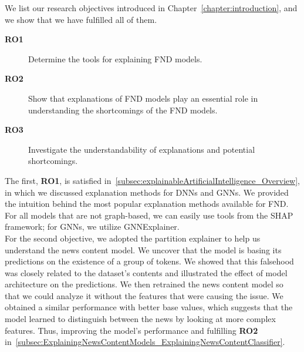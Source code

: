 We list our research objectives introduced in Chapter~\ref{chapter:introduction}, and we show that we have fulfilled all of them.
\begin{description}
    \item[\textbf{RO1}] Determine the tools for explaining FND models.
    \item[\textbf{RO2}] Show that explanations of FND models play an essential role in understanding the shortcomings of the FND models.
    \item[\textbf{RO3}] Investigate the understandability of explanations and potential shortcomings.
\end{description}
The first, \textbf{RO1}, is satisfied in~\ref{subsec:explainableArtificialIntelligence_Overview}, in which we discussed explanation methods for DNNs and GNNs. We provided the intuition behind the most popular explanation methods available for FND. For all models that are not graph-based, we can easily use tools from the SHAP framework; for GNNs, we utilize GNNExplainer. \\
For the second objective, we adopted the partition explainer to help us understand the news content model. We uncover that the model is basing its predictions on the existence of a group of tokens. We showed that this falsehood was closely related to the dataset's contents and illustrated the effect of model architecture on the predictions. We then retrained the news content model so that we could analyze it without the features that were causing the issue. We obtained a similar performance with better base values, which suggests that the model learned to distinguish between the news by looking at more complex features. Thus, improving the model's performance and fulfilling \textbf{RO2} in~\ref{subsec:ExplainingNewsContentModels_ExplainingNewsContentClassifier}.\\
